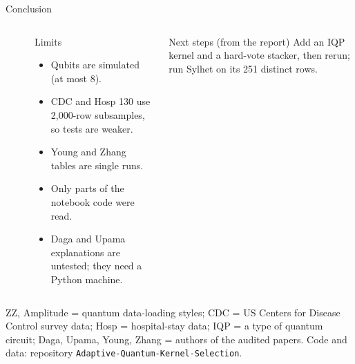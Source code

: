 \documentclass[aspectratio=169,10pt,t,xcolor={table,dvipsnames}]{beamer}
\begin{document}
\begin{frame}{Conclusion}
  \begin{columns}[T]
      \\[3pt]
      \\[3pt]

      \begin{block}{Limits}
        \scriptsize
        \begin{itemize}
          \item Qubits are simulated (at most 8).
          \item CDC and Hosp 130 use 2,000-row subsamples, so tests are weaker.
          \item Young and Zhang tables are single runs.
          \item Only parts of the notebook code were read.
          \item Daga and Upama explanations are untested; they need a Python machine.
        \end{itemize}
      \end{block}
      \begin{exampleblock}{Next steps (from the report)}
        \scriptsize Add an IQP kernel and a hard-vote stacker, then rerun; run Sylhet on its 251 distinct rows.
      \end{exampleblock}
  \end{columns}
  \vfill
  {\tiny ZZ, Amplitude = quantum data-loading styles; CDC = US Centers for Disease Control survey data; Hosp = hospital-stay data; IQP = a type of quantum circuit; Daga, Upama, Young, Zhang = authors of the audited papers. Code and data: repository \texttt{Adaptive-Quantum-Kernel-Selection}.}
\end{frame}
\end{document}
